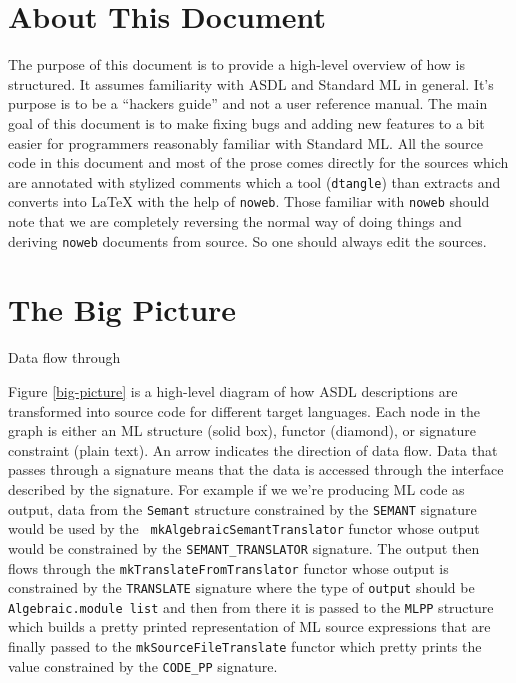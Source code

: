 \section{About This Document} 
The purpose of this document is to provide a high-level overview of how
\asdlGen is structured. It assumes familiarity with ASDL and Standard ML in
general. It's purpose is to be a ``hackers guide'' and not a user reference
manual. The main goal of this document is to make fixing bugs and adding new
features to \asdlGen a bit easier for programmers reasonably familiar with
Standard ML. All the source code in this document and most of the prose
comes directly for the \asdlGen sources which are annotated with stylized
comments which a tool ({\tt dtangle}) than extracts and converts into \LaTeX
with the help of {\tt noweb}. Those familiar with {\tt noweb} should note
that we are completely reversing the normal way of doing things and deriving
{\tt noweb} documents from source. So one should always edit the sources.

\section{The Big Picture}
\begin{myfigure}
\caption{Data flow through \asdlGen \label{big-picture}}
\end{myfigure}
Figure \ref{big-picture} is a high-level diagram of how ASDL descriptions
are transformed into source code for different target languages. Each node
in the graph is either an ML structure (solid box), functor (diamond), or
signature constraint (plain text). An arrow indicates the direction of data
flow. Data that passes through a signature means that the data is accessed
through the interface described by the signature. For example if we we're
producing ML code as output, data from the {\tt Semant} structure
constrained by the {\tt SEMANT} signature would be used by the {\tt
mkAlgebraicSemantTranslator} functor whose output would be constrained by
the {\tt SEMANT\_TRANSLATOR} signature. The output then flows through the
{\tt mkTranslateFromTranslator} functor whose output is constrained by the
{\tt TRANSLATE} signature where the type of {\tt output} should be {\tt
Algebraic.module list} and then from there it is passed to the {\tt MLPP}
structure which builds a pretty printed representation of ML source
expressions that are finally passed to the {\tt mkSourceFileTranslate}
functor which pretty prints the value constrained by the {\tt CODE\_PP}
signature.

